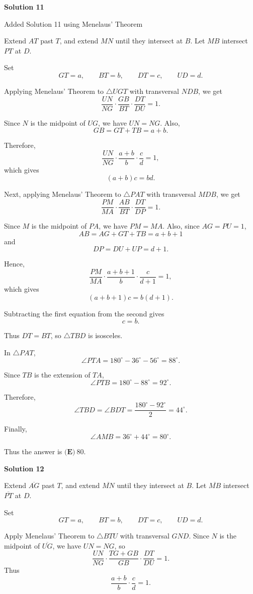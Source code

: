 \begin{enumerate}
\textbf{Solution 11}

Added Solution 11 using Menelaus' Theorem

 Extend $AT$ past $T$, and extend $MN$ until they intersect at $B$. Let $MB$ intersect $PT$ at $D$.

 Set
 \[GT=a,\qquad BT=b,\qquad DT=c,\qquad UD=d.\]

 Applying Menelaus' Theorem to $\triangle UGT$ with transversal $NDB$, we get
 \[\frac{UN}{NG}\cdot\frac{GB}{BT}\cdot\frac{DT}{DU}=1.\]

 Since $N$ is the midpoint of $UG$, we have $UN=NG$. Also,
 \[GB=GT+TB=a+b.\]

 Therefore,
 \[\frac{UN}{NG}\cdot\frac{a+b}{b}\cdot\frac{c}{d}=1,\]which gives
 \[(a+b)c=bd.\]

 Next, applying Menelaus' Theorem to $\triangle PAT$ with transversal $MDB$, we get
 \[\frac{PM}{MA}\cdot\frac{AB}{BT}\cdot\frac{DT}{DP}=1.\]

 Since $M$ is the midpoint of $PA$, we have $PM=MA$. Also, since $AG=PU=1$,
 \[AB=AG+GT+TB=a+b+1\]and
 \[DP=DU+UP=d+1.\]

 Hence,
 \[\frac{PM}{MA}\cdot\frac{a+b+1}{b}\cdot\frac{c}{d+1}=1,\]which gives
 \[(a+b+1)c=b(d+1).\]

 Subtracting the first equation from the second gives
 \[c=b.\]

 Thus $DT=BT$, so $\triangle TBD$ is isosceles.

 In $\triangle PAT$,
 \[\angle PTA=180^\circ-36^\circ-56^\circ=88^\circ.\]

 Since $TB$ is the extension of $TA$,
 \[\angle PTB=180^\circ-88^\circ=92^\circ.\]

 Therefore,
 \[\angle TBD=\angle BDT=\frac{180^\circ-92^\circ}{2}=44^\circ.\]

 Finally,
 \[\angle AMB=36^\circ+44^\circ=\boxed{80^\circ}.\]

 Thus the answer is $\boxed{\textbf{(E)}\ 80}$.

 



\textbf{Solution 12}

Extend $\overline{AG}$ past $T$, and extend $\overline{MN}$ until they intersect at $B$. Let $\overline{MB}$ intersect $\overline{PT}$ at $D$.

 Set
 \[GT=a,\qquad BT=b,\qquad DT=c,\qquad UD=d.\]

 Apply Menelaus' Theorem to $\triangle BTU$ with transversal $GND$. Since $N$ is the midpoint of $\overline{UG}$, we have $UN=NG$, so
 \[\frac{UN}{NG}\cdot\frac{TG+GB}{GB}\cdot\frac{DT}{DU}=1.\]Thus\[\frac{a+b}{b}\cdot\frac{c}{d}=1.\tag{1}\]


\end{enumerate}
